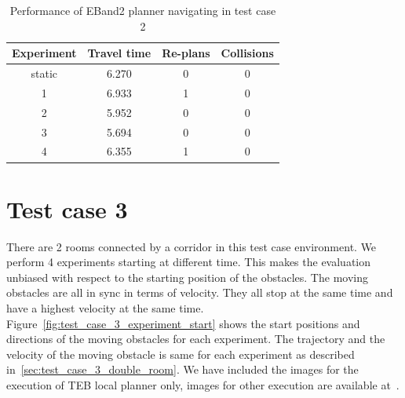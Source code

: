 \begin{table}[H]
    \centering
    \begin{tabular}{cccc}
        \textbf{Experiment} & \textbf{Travel time} & \textbf{Re-plans} & \textbf{Collisions} \\\toprule
        static & 6.270 & 0 & 0 \\
             1 & 6.933 & 1 & 0 \\
             2 & 5.952 & 0 & 0 \\
             3 & 5.694 & 0 & 0 \\
             4 & 6.355 & 1 & 0 \\
    \end{tabular}
    \caption{Performance of EBand2 planner navigating in test case 2}\label{tab:perfomance_eband2_test_case_2}
\end{table}

\newpage{}
\section{Test case 3}%
\label{sec:test_case_3}

There are 2 rooms connected by a corridor in this test case environment. We perform 4 experiments 
starting at different time. This makes the evaluation unbiased with respect to
the starting position of the obstacles. The moving obstacles are all in sync in terms of velocity. 
They all stop at the same time and have a highest velocity at the same time.   
Figure~\ref{fig:test_case_3_experiment_start} shows the start positions and directions of the moving
obstacles for each experiment. The trajectory and the velocity of the moving obstacle is same for each
experiment as described in~\ref{sec:test_case_3_double_room}. We have included the images for the 
execution of TEB local planner only, images for other execution are available at~\cite{evalimages}.


